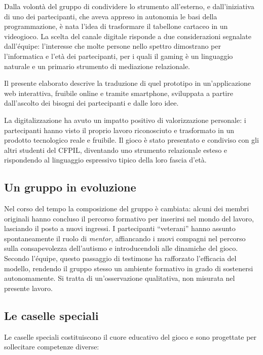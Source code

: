 \documentclass[12pt]{report}
\begin{document}
Dalla volontà del gruppo di condividere lo strumento all'esterno, e dall'iniziativa di uno dei partecipanti, che aveva appreso in autonomia le basi della programmazione, è nata l'idea di trasformare il tabellone cartaceo in un videogioco. La scelta del canale digitale risponde a due considerazioni segnalate dall'équipe: l'interesse che molte persone nello spettro dimostrano per l'informatica e l'età dei partecipanti, per i quali il gaming è un linguaggio naturale e un primario strumento di mediazione relazionale.

Il presente elaborato descrive la traduzione di quel prototipo in un'applicazione web interattiva, fruibile online e tramite smartphone, sviluppata a partire dall'ascolto dei bisogni dei partecipanti e dalle loro idee.

La digitalizzazione ha avuto un impatto positivo di valorizzazione personale: i partecipanti hanno visto il proprio lavoro riconosciuto e trasformato in un prodotto tecnologico reale e fruibile. Il gioco è stato presentato e condiviso con gli altri studenti del CFPIL, diventando uno strumento relazionale esteso e rispondendo al linguaggio espressivo tipico della loro fascia d'età.

\subsection{Un gruppo in evoluzione}

Nel corso del tempo la composizione del gruppo è cambiata: alcuni dei membri originali hanno concluso il percorso formativo per inserirsi nel mondo del lavoro, lasciando il posto a nuovi ingressi. I partecipanti ``veterani'' hanno assunto spontaneamente il ruolo di \textit{mentor}, affiancando i nuovi compagni nel percorso sulla consapevolezza dell'autismo e introducendoli alle dinamiche del gioco. Secondo l'équipe, questo passaggio di testimone ha rafforzato l'efficacia del modello, rendendo il gruppo stesso un ambiente formativo in grado di sostenersi autonomamente. Si tratta di un'osservazione qualitativa, non misurata nel presente lavoro.

\subsection{Le caselle speciali}

Le caselle speciali costituiscono il cuore educativo del gioco e sono progettate per sollecitare competenze diverse:
\end{document}
